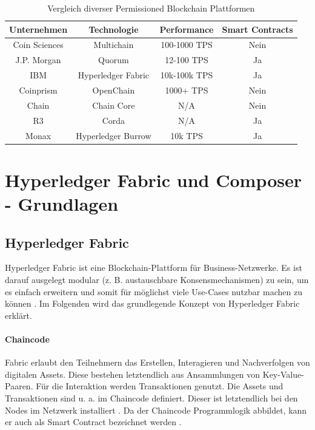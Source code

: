 \begin{table}[h]
    \centering
	\begin{tabular}{c c c c}
	\textbf{Unternehmen} & \textbf{Technologie}  & \textbf{Performance} & \textbf{Smart Contracts} \\ \hline
	Coin Sciences & Multichain & 100-1000 TPS & Nein \\ \hline
    J.P. Morgan & Quorum & 12-100 TPS & Ja \\ \hline
    IBM & Hyperledger Fabric & 10k-100k TPS & Ja \\ \hline
    Coinprism & OpenChain & 1000+ TPS & Nein \\ \hline
    Chain & Chain Core & N/A & Nein \\ \hline
    R3 & Corda & N/A & Ja \\ \hline
    Monax & Hyperledger Burrow & 10k TPS & Ja \\
    \end{tabular}
    \caption{Vergleich diverser Permissioned Blockchain Plattformen \cite{BenHamidaBlockchainEnterpriseOverview2017}\cite{HyperledgerBurrowTeamHyperledgerBurrowGitHub2018}}
	\label{tab:perm-comparison}
\end{table}


\section{Hyperledger Fabric und Composer - Grundlagen}
\label{sec:hyperledger-fabric-composer}

\subsection{Hyperledger Fabric}
Hyperledger Fabric ist eine Blockchain-Plattform für Business-Netzwerke. Es ist darauf ausgelegt modular (z. B. austauschbare Konsensmechanismen) zu sein, um es einfach erweitern und somit für möglichst viele Use-Cases nutzbar machen zu können \cite{HyperledgerFabricTeamHyperledgerWhitepaper2016}. Im Folgenden wird das grundlegende Konzept von Hyperledger Fabric erklärt.

\paragraph{Chaincode}
Fabric erlaubt den Teilnehmern das Erstellen, Interagieren und Nachverfolgen von digitalen Assets. Diese bestehen letztendlich aus Ansammlungen von Key-Value-Paaren. Für die Interaktion werden Transaktionen genutzt. Die Assets und Transaktionen sind u. a. im Chaincode definiert. Dieser ist letztendlich bei den Nodes im Netzwerk installiert \cite{SchererPerformanceScalabilityBlockchain2017}. Da der Chaincode Programmlogik abbildet, kann er auch als Smart Contract bezeichnet werden \cite{HyperledgerFabricTeamChaincodeHyperledgerFabric}.

